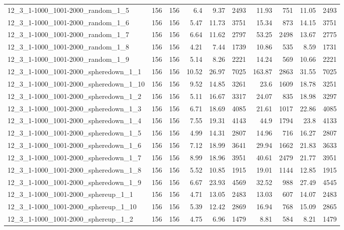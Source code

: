 \begin{center}
\begin{scriptsize}
\begin{longtable}{lrrrrrrrrr}
12\_3\_1-1000\_1001-2000\_random\_1\_5 & 156 & 156 & 6.4 & 9.37 & 2493 & 11.93 & 751 & 11.05 & 2493\\
12\_3\_1-1000\_1001-2000\_random\_1\_6 & 156 & 156 & 5.47 & 11.73 & 3751 & 15.34 & 873 & 14.15 & 3751\\
12\_3\_1-1000\_1001-2000\_random\_1\_7 & 156 & 156 & 6.64 & 11.62 & 2797 & 53.25 & 2498 & 13.67 & 2775\\
12\_3\_1-1000\_1001-2000\_random\_1\_8 & 156 & 156 & 4.21 & 7.44 & 1739 & 10.86 & 535 & 8.59 & 1731\\
12\_3\_1-1000\_1001-2000\_random\_1\_9 & 156 & 156 & 5.14 & 8.26 & 2221 & 14.24 & 569 & 10.66 & 2221\\
12\_3\_1-1000\_1001-2000\_spheredown\_1\_1 & 156 & 156 & 10.52 & 26.97 & 7025 & 163.87 & 2863 & 31.55 & 7025\\
12\_3\_1-1000\_1001-2000\_spheredown\_1\_10 & 156 & 156 & 9.52 & 14.85 & 3261 & 23.6 & 1609 & 18.78 & 3251\\
12\_3\_1-1000\_1001-2000\_spheredown\_1\_2 & 156 & 156 & 5.11 & 16.67 & 3317 & 24.07 & 835 & 18.98 & 3297\\
12\_3\_1-1000\_1001-2000\_spheredown\_1\_3 & 156 & 156 & 6.71 & 18.69 & 4085 & 21.61 & 1017 & 22.86 & 4085\\
12\_3\_1-1000\_1001-2000\_spheredown\_1\_4 & 156 & 156 & 7.55 & 19.31 & 4143 & 44.9 & 1794 & 23.8 & 4133\\
12\_3\_1-1000\_1001-2000\_spheredown\_1\_5 & 156 & 156 & 4.99 & 14.31 & 2807 & 14.96 & 716 & 16.27 & 2807\\
12\_3\_1-1000\_1001-2000\_spheredown\_1\_6 & 156 & 156 & 7.12 & 18.99 & 3641 & 29.94 & 1662 & 21.83 & 3633\\
12\_3\_1-1000\_1001-2000\_spheredown\_1\_7 & 156 & 156 & 8.99 & 18.96 & 3951 & 40.61 & 2479 & 21.77 & 3951\\
12\_3\_1-1000\_1001-2000\_spheredown\_1\_8 & 156 & 156 & 5.52 & 10.85 & 1915 & 19.01 & 1144 & 12.85 & 1915\\
12\_3\_1-1000\_1001-2000\_spheredown\_1\_9 & 156 & 156 & 6.67 & 23.93 & 4569 & 32.52 & 988 & 27.49 & 4545\\
12\_3\_1-1000\_1001-2000\_sphereup\_1\_1 & 156 & 156 & 4.71 & 13.05 & 2483 & 13.03 & 607 & 14.07 & 2483\\
12\_3\_1-1000\_1001-2000\_sphereup\_1\_10 & 156 & 156 & 5.39 & 12.42 & 2869 & 16.94 & 768 & 15.09 & 2865\\
12\_3\_1-1000\_1001-2000\_sphereup\_1\_2 & 156 & 156 & 4.75 & 6.96 & 1479 & 8.81 & 584 & 8.21 & 1479\\

\end{longtable}
\end{scriptsize}
\end{center}
